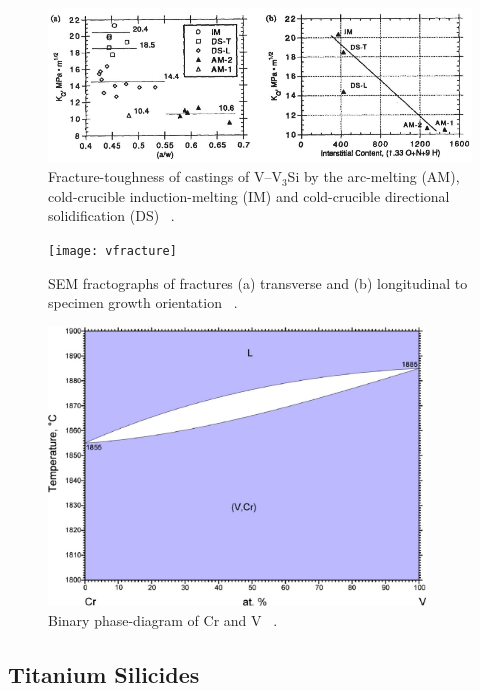 %
\begin{figure}[H]
\begin{center}
\includegraphics[width=16.5cm]{vkic}
\caption{Fracture-toughness of castings of V--V$_3$Si by the arc-melting (AM), cold-crucible induction-melting (IM) and cold-crucible directional solidification (DS) ~\cite{strum94}.}\label{fig:vkic}
\end{center}
\end{figure}
%
%
\begin{figure}[H]
\begin{center}
\texttt{[image: vfracture]}
\caption{SEM fractographs of fractures (a) transverse and (b) longitudinal to specimen growth orientation ~\cite{strum94}.}\label{fig:vfracture}
\end{center}
\end{figure}
%
%
\vspace{1mm}
\begin{figure}[H]
\begin{center}
\includegraphics[width=10cm]{CrV}
\caption{Binary phase-diagram of Cr and V ~\cite{kocherzhinskii85}.}\label{fig:CrV}
\end{center}
\end{figure}
%

\subsection{Titanium Silicides}

